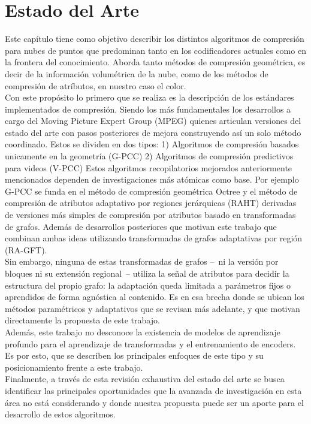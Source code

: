 \chapter{Estado del Arte}

Este capítulo tiene como objetivo describir los distintos algoritmos de compresión para nubes de puntos que predominan tanto en los codificadores actuales como en la frontera del conocimiento. Aborda tanto métodos de compresión geométrica, es decir de la información volumétrica de la nube, como de los métodos de compresión de atríbutos, en nuestro caso el color.\\
Con este propósito lo primero que se realiza es la descripción de los estándares implementados de compresión. Siendo los más fundamentales los desarrollos a cargo del Moving Picture Expert Group (MPEG) quienes articulan versiones del estado del arte con pasos posteriores de mejora construyendo así un solo método coordinado. Estos se dividen en dos tipos: 1) Algoritmos de compresión basados unicamente en la geometría (G-PCC) 2) Algoritmos de compresión predictivos para videos (V-PCC)
Estos algoritmos recopilatorios mejorados anteriormente mencionados dependen de investigaciones más atómicas como base. Por ejemplo G-PCC se funda en el método de compresión geométrica Octree y el método de compresión de atributos adaptativo por regiones jerárquicas (RAHT) derivadas de versiones más simples de compresión por atributos basado en transformadas de grafos. Además de desarrollos posteriores que motivan este trabajo que combinan ambas ideas utilizando transformadas de grafos adaptativas por región (RA-GFT).  \\
Sin embargo, ninguna de estas transformadas de grafos --~ni la versión por bloques ni su extensión regional~-- utiliza la señal de atributos para decidir la estructura del propio grafo: la adaptación queda limitada a parámetros fijos o aprendidos de forma agnóstica al contenido. Es en esa brecha donde se ubican los métodos paramétricos y adaptativos que se revisan más adelante, y que motivan directamente la propuesta de este trabajo.\\
Además, este trabajo no desconoce la existencia de modelos de aprendizaje profundo para el aprendizaje de transformadas y el entrenamiento de encoders. Es por esto, que se describen los principales enfoques de este tipo y su posicionamiento frente a este trabajo.\\
Finalmente, a través de esta revisión exhaustiva del estado del arte se busca identificar las principales oportunidades que la avanzada de investigación en esta área no está considerando y donde nuestra propuesta puede ser un aporte para el desarrollo de estos algoritmos. 

